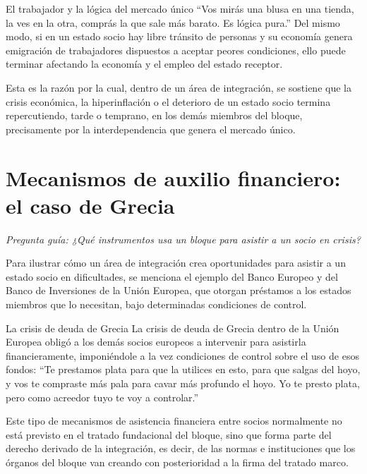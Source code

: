 \documentclass[12pt,oneside]{book}
\begin{document}
\begin{example}{El trabajador y la lógica del mercado único}
``Vos mirás una blusa en una tienda, la ves en la otra, comprás la que sale más barato. Es lógica pura.'' Del mismo modo, si en un estado socio hay libre tránsito de personas y su economía genera emigración de trabajadores dispuestos a aceptar peores condiciones, ello puede terminar afectando la economía y el empleo del estado receptor.
\end{example}

Esta es la razón por la cual, dentro de un área de integración, se sostiene que la crisis económica, la hiperinflación o el deterioro de un estado socio termina repercutiendo, tarde o temprano, en los demás miembros del bloque, precisamente por la interdependencia que genera el mercado único.

\section{Mecanismos de auxilio financiero: el caso de Grecia}

\textit{Pregunta guía: ¿Qué instrumentos usa un bloque para asistir a un socio en crisis?}

Para ilustrar cómo un área de integración crea oportunidades para asistir a un estado socio en dificultades, se menciona el ejemplo del Banco Europeo y del Banco de Inversiones de la Unión Europea, que otorgan préstamos a los estados miembros que lo necesitan, bajo determinadas condiciones de control.

\begin{example}{La crisis de deuda de Grecia}
La crisis de deuda de Grecia dentro de la Unión Europea obligó a los demás socios europeos a intervenir para asistirla financieramente, imponiéndole a la vez condiciones de control sobre el uso de esos fondos: ``Te prestamos plata para que la utilices en esto, para que salgas del hoyo, y vos te compraste más pala para cavar más profundo el hoyo. Yo te presto plata, pero como acreedor tuyo te voy a controlar.''
\end{example}

Este tipo de mecanismos de asistencia financiera entre socios normalmente no está previsto en el tratado fundacional del bloque, sino que forma parte del derecho derivado de la integración, es decir, de las normas e instituciones que los órganos del bloque van creando con posterioridad a la firma del tratado marco.
\end{document}

